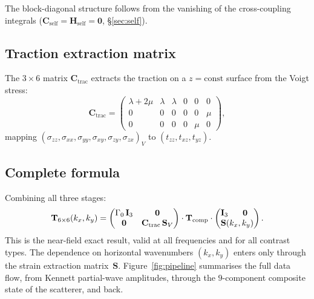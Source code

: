 \documentclass[11pt,a4paper]{article}
\newcommand{\bI}{\mathbf{I}}
\newcommand{\bT}{\mathbf{T}}
\newcommand{\bS}{\mathbf{S}}
\newcommand{\bC}{\mathbf{C}}
\newcommand{\bH}{\mathbf{H}}
\begin{document}
The block-diagonal structure follows from the vanishing of the
cross-coupling integrals ($\bC_\text{self} = \bH_\text{self}
= \mathbf{0}$, \S\ref{sec:self}).

\subsection{Traction extraction matrix}

The $3 \times 6$ matrix $\bC_\text{trac}$ extracts the traction on a
$z = \text{const}$ surface from the Voigt stress:
\begin{equation}
  \bC_\text{trac}
  = \begin{pmatrix}
      \lambda + 2\mu & \lambda & \lambda & 0 & 0 & 0 \\
      0 & 0 & 0 & 0 & 0 & \mu \\
      0 & 0 & 0 & 0 & \mu & 0
    \end{pmatrix},
  \label{eq:Ctrac}
\end{equation}
mapping $(\sigma_{zz}, \sigma_{xx}, \sigma_{yy}, \sigma_{xy},
\sigma_{zy}, \sigma_{zx})_V$ to $(t_{zz}, t_{xz}, t_{yz})$.

\subsection{Complete formula}

Combining all three stages:
\begin{equation}
  \bT_{6 \times 6}(k_x, k_y)
  = \begin{pmatrix}
      \Gamma_0\,\bI_3 & \mathbf{0} \\
      \mathbf{0} & \bC_\text{trac}\,\bS_V
    \end{pmatrix}
  \cdot \bT_\text{comp}
  \cdot \begin{pmatrix}
      \bI_3 & \mathbf{0} \\
      \multicolumn{2}{c}{\bS(k_x, k_y)}
    \end{pmatrix}.
  \label{eq:T6x6_full}
\end{equation}
This is the near-field exact result, valid at all frequencies and for
all contrast types.  The dependence on horizontal wavenumbers
$(k_x, k_y)$ enters only through the strain extraction
matrix~$\bS$.  Figure~\ref{fig:pipeline} summarises the full data
flow, from Kennett partial-wave amplitudes, through the
$9$-component composite state of the scatterer, and back.
\end{document}
